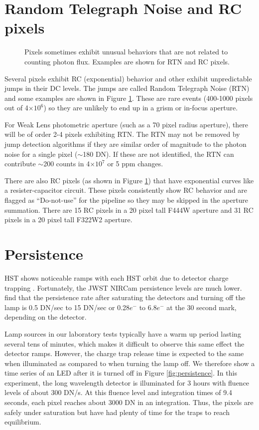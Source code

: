 \documentclass[]{aastex62}
\begin{document}
\section{Random Telegraph Noise and RC pixels}

\begin{figure}
\caption{Pixels sometimes exhibit unusual behaviors that are not related to counting photon flux.
Examples are shown for RTN and RC pixels.
}\label{fig:RTNandRC}
\end{figure}

Several pixels exhibit RC (exponential) behavior and other exhibit unpredictable jumps in their DC levels.
The jumps are called Random Telegraph Noise (RTN) and some examples are shown in Figure \ref{fig:RTNandRC}.
These are rare events (400-1000 pixels out of 4$\times 10^6$) so they are unlikely to end up in a grism or in-focus aperture.

For Weak Lens photometric aperture (such as a 70 pixel radius aperture), there will be of order 2-4 pixels exhibiting RTN.
The RTN may not be removed by jump detection algorithms if they are similar order of magnitude to the photon noise for a single pixel ($\sim$180 DN).
If these are not identified, the RTN can contribute $\sim$200 counts in 4$\times 10^7$ or 5 ppm changes.

There are also RC pixels (as shown in Figure \ref{fig:RTNandRC}) that have exponential curves like a resister-capacitor circuit.
These pixels consistently show RC behavior and are flagged as ``Do-not-use'' for the pipeline so they may be skipped in the aperture summation.
There are 15 RC pixels in a 20 pixel tall F444W aperture and 31 RC pixels in a 20 pixel tall F322W2 aperture.



\section{Persistence}\label{sec:persistence}
HST shows noticeable ramps with each HST orbit due to detector charge trapping \citep{zhou2017chargeTrap}.
Fortunately, the JWST NIRCam persistence levels are much lower.
\citet{leisenring2016persistence} find that the persistence rate after saturating the detectors and turning off the lamp is 0.5 DN/sec to 15 DN/sec or 0.28$e^-$ to 6.8$e^-$ at the 30 second mark, depending on the detector.

Lamp sources in our laboratory tests typically have a warm up period lasting several tens of minutes, which makes it difficult to observe this same effect the detector ramps.
However, the charge trap release time is expected to the same when illuminated as compared to when turning the lamp off.
We therefore show a time series of an LED after it is turned off in Figure \ref{fig:persistence}.
In this experiment, the long wavelength detector is illuminated for 3 hours with fluence levels of about 300 DN/s.
At this fluence level and integration times of 9.4 seconds, each pixel reaches about 3000 DN in an integration.
Thus, the pixels are safely under saturation but have had plenty of time for the traps to reach equilibrium.
\end{document}
